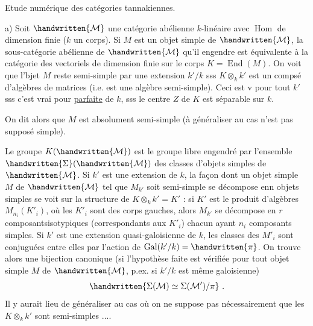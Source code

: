 Etude numérique des catégories tannakiennes.

a) Soit $\handwritten{\mathcal{M}}$ une catégorie abélienne $k$-linéaire avec $\operatorname{Hom}$ de dimension finie ($k$ un corps). Si $M$ est un objet simple de $\handwritten{\mathcal{M}}$, la sous-catégorie abélienne de $\handwritten{\mathcal{M}}$ qu'il engendre est équivalente à la catégorie des vectoriels de dimension finie sur le corps $K=\operatorname{End}(M)$. On voit  que l'bjet $M$ reste semi-simple par une extension $k'/k$ sss $K\otimes_k k'$ est un compsé  d'algèbres de matrices (i.e. est une algèbre semi-simple). Ceci est v pour tout $k'$ sss c'est vrai pour  \uline{parfaite} de $k$,  sss le centre  $Z$ de $K$ est séparable sur $k$. On dit alors que $M$ est absolument semi-simple (à généraliser au cas n'est pas supposé simple).

Le groupe $K(\handwritten{\mathcal{M}})$ est le groupe libre engendré par l'ensemble $\handwritten{\Sigma}(\handwritten{\mathcal{M}})$ des classes d'objets simples de $\handwritten{\mathcal{M}}$. Si $k'$ est une extension de $k$, la façon dont un objet simple $M$ de $\handwritten{\mathcal{M}}$ tel que $M_{k'}$ soit semi-simple se décompose enn objets simples se voit sur la structure de $K\otimes_k k'=K'$ : si $K'$ est le produit d'algèbres $M_{n_i}(K'_i)$, où les $K'_i$ sont des corps gauches, alors $M_{k'}$ se décompose en $r$ composantsisotypiques (correspondants aux $K'_i$) chacun ayant $n_i$ composants simples. Si $k'$ est une extension quasi-galoisienne de $k$, les classes des $M'_i$ sont conjuguées entre elles par l'action de $\operatorname{Gal}(k'/k)=\handwritten{\pi}$. On trouve alors une bijection canonique (si l'hypothèse faite est vérifiée pour tout objet simple  $M$ de $\handwritten{\mathcal{M}}$, p.ex. si $k'/k$ est même galoisienne)
\[
\handwritten{\Sigma(\mathcal{M})\simeq\Sigma(\mathcal{M}')/\pi}\ .
\]
Il y aurait lieu de généraliser au cas où on ne suppose pas nécessairement que les $K\otimes_k k'$ sont semi-simples ....

